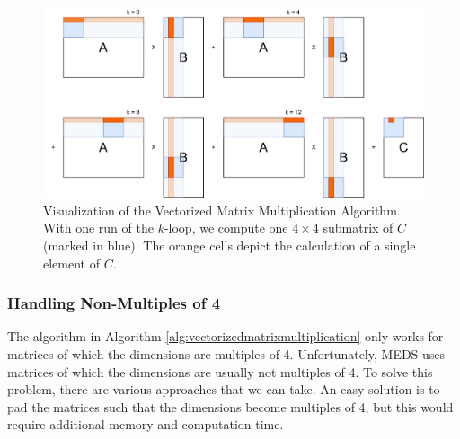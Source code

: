 \documentclass[11pt,a4paper]{report}
\theoremstyle{definition}
\begin{document}
\begin{figure}
  \centering
  \includegraphics[width=\textwidth]{matmul/parallel_matmul.png}
  \caption{Visualization of the Vectorized Matrix Multiplication Algorithm. With one run of the $k$-loop, we compute one $4\times4$ submatrix of $C$ (marked in blue). The orange cells depict the calculation of a single element of $C$.}
  \label{fig:vectorizedmatrixmultiplication}
\end{figure}

\subsubsection{Handling Non-Multiples of 4}
The algorithm in Algorithm \ref{alg:vectorizedmatrixmultiplication} only works for matrices of which the dimensions are multiples of 4. Unfortunately, MEDS uses matrices of which the dimensions are usually not multiples of 4. To solve this problem, there are various approaches that we can take. An easy solution is to pad the matrices such that the dimensions become multiples of 4, but this would require additional memory and computation time.
\end{document}
